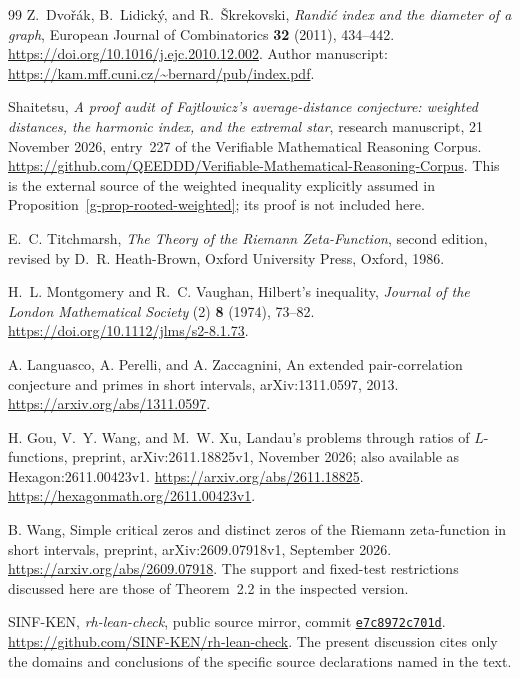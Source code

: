 \documentclass[11pt,a4paper]{article}
\theoremstyle{definition}
\theoremstyle{remark}
\begin{document}
\begin{thebibliography}{99}
Z.~Dvo\v r\'ak, B.~Lidick\'y, and R.~\v Skrekovski,
\emph{Randi\'c index and the diameter of a graph},
European Journal of Combinatorics \textbf{32} (2011), 434--442.
\url{https://doi.org/10.1016/j.ejc.2010.12.002}.
Author manuscript: \url{https://kam.mff.cuni.cz/~bernard/pub/index.pdf}.

Shaitetsu,
\emph{A proof audit of Fajtlowicz's average-distance conjecture:
weighted distances, the harmonic index, and the extremal star},
research manuscript, 21 November 2026, entry~227 of the
Verifiable Mathematical Reasoning Corpus.
\url{https://github.com/QEEDDD/Verifiable-Mathematical-Reasoning-Corpus}.
This is the external source of the weighted inequality explicitly assumed
in Proposition~\ref{g-prop-rooted-weighted}; its proof is not included here.

E.~C. Titchmarsh,
\emph{The Theory of the Riemann Zeta-Function},
second edition, revised by D.~R. Heath-Brown,
Oxford University Press, Oxford, 1986.

H.~L. Montgomery and R.~C. Vaughan,
Hilbert's inequality,
\emph{Journal of the London Mathematical Society} (2)
\textbf{8} (1974), 73--82.
\url{https://doi.org/10.1112/jlms/s2-8.1.73}.

A. Languasco, A. Perelli, and A. Zaccagnini,
An extended pair-correlation conjecture and primes in short intervals,
arXiv:1311.0597, 2013.
\url{https://arxiv.org/abs/1311.0597}.

H. Gou, V.~Y. Wang, and M.~W. Xu,
Landau's problems through ratios of $L$-functions,
preprint, arXiv:2611.18825v1, November 2026;
also available as Hexagon:2611.00423v1.
\url{https://arxiv.org/abs/2611.18825}.
\url{https://hexagonmath.org/2611.00423v1}.

B. Wang,
Simple critical zeros and distinct zeros of the Riemann zeta-function in
short intervals,
preprint, arXiv:2609.07918v1, September 2026.
\url{https://arxiv.org/abs/2609.07918}.
The support and fixed-test restrictions discussed here are those of
Theorem~2.2 in the inspected version.

SINF-KEN,
\emph{rh-lean-check}, public source mirror,
commit \href{https://github.com/SINF-KEN/rh-lean-check/tree/e7c8972c701d3396947808ab20cc16dc14623d33}{\texttt{e7c8972c701d}}.
\url{https://github.com/SINF-KEN/rh-lean-check}.
The present discussion cites only the domains and conclusions of the
specific source declarations named in the text.


\end{thebibliography}
\end{document}
